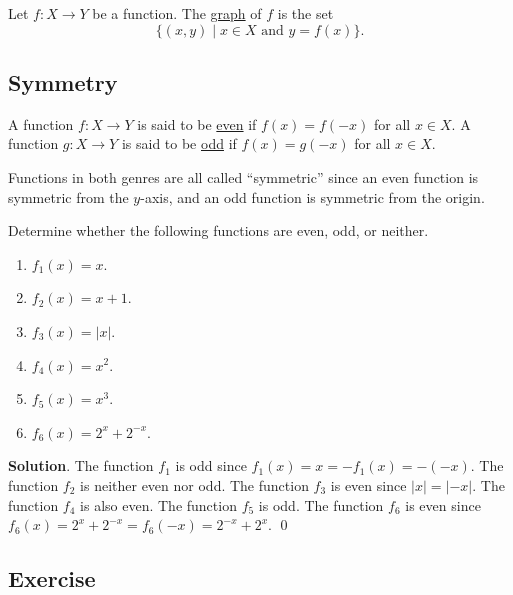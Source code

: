 \documentclass[11pt]{book}
\theoremstyle{break}
\theoremstyle{no_label}
\numberwithin{equation}{section}
\begin{document}
\begin{definition}[Graph]
    Let $f:X\to Y$ be a function. The \underline{graph} of $f$ is the set $$\{(x, y)\mid x\in X\text{ and }y=f(x)\}.$$
\end{definition}

\subsection*{Symmetry}

\begin{definition}
    A function $f:X\to Y$ is said to be \underline{even} if $f(x)=f(-x)$ for all $x\in X$. A function $g:X\to Y$ is said to be \underline{odd} if $f(x)=g(-x)$ for all $x\in X$.
\end{definition}

Functions in both genres are all called ``symmetric'' since an even function is symmetric from the $y$-axis, and an odd function is symmetric from the origin.

\begin{example}
    Determine whether the following functions are even, odd, or neither.
    \begin{enumerate}
        \item $f_1(x)=x$.
        \item $f_2(x)=x+1$.
        \item $f_3(x)=|x|$.
        \item $f_4(x)=x^2$.
        \item $f_5(x)=x^3$.
        \item $f_6(x)=2^x+2^{-x}$.
    \end{enumerate}
\end{example}
\textbf{Solution}. The function $f_1$ is odd since $f_1(x)=x=-f_1(x)=-(-x)$. The function $f_2$ is neither even nor odd. The function $f_3$ is even since $|x|=|-x|$. The function $f_4$ is also even. The function $f_5$ is odd. The function $f_6$ is even since $f_6(x)=2^x+2^{-x}=f_6(-x)=2^{-x}+2^x$. \qed

\subsection*{Exercise}
\end{document}
